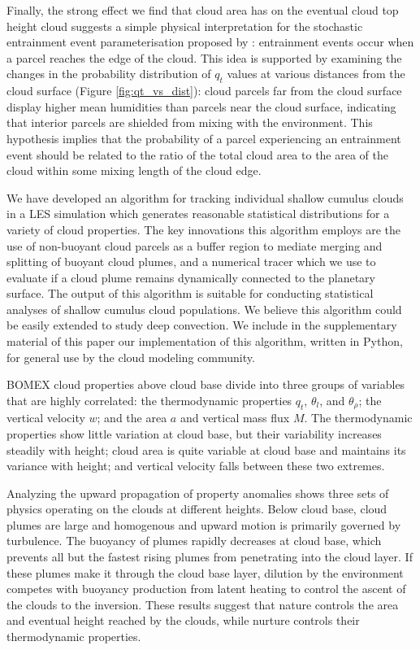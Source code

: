 \documentclass[acp]{copernicus}
\begin{document}
Finally, the strong effect we find that cloud area has on the eventual cloud 
top height cloud suggests a simple physical interpretation for the stochastic 
entrainment event parameterisation proposed by \cite{Romps2010a}: entrainment 
events occur when a parcel reaches the edge of the cloud. This idea is 
supported by examining the changes in the probability distribution of $q_t$ 
values at various distances from the cloud surface (Figure 
\ref{fig:qt_vs_dist}): cloud parcels far from the cloud surface display higher
mean humidities than parcels near the cloud surface, indicating that interior 
parcels are shielded from mixing with the environment.  This hypothesis 
implies that the probability of a parcel experiencing an entrainment event 
should be related to the ratio of the total cloud area to the area of the 
cloud within some mixing length of the cloud edge.


\conclusions
We have developed an algorithm for tracking individual shallow cumulus clouds 
in a LES simulation which generates reasonable statistical distributions for a 
variety of cloud properties.  The key innovations this algorithm employs are 
the use of non-buoyant cloud parcels as a buffer region to mediate merging and 
splitting of buoyant cloud plumes, and a numerical tracer which we use to 
evaluate if a cloud plume remains dynamically connected to the planetary 
surface.  The output of this algorithm is suitable for conducting statistical 
analyses of shallow cumulus cloud populations.  We believe this algorithm could 
be easily extended to study deep convection.  We include in the supplementary 
material of this paper our implementation of this algorithm, written in Python, 
for general use by the cloud modeling community.

BOMEX cloud properties above cloud base divide into three groups of variables 
that are highly correlated: the thermodynamic properties $q_t$, $\theta_l$, 
and $\theta_\rho$; the vertical velocity $w$; and the area $a$ and vertical 
mass flux $M$.  The thermodynamic properties show little variation at cloud 
base, but their variability increases steadily with height; cloud area is 
quite variable at cloud base and maintains its variance with height; and 
vertical velocity falls between these two extremes.

Analyzing the upward propagation of property anomalies shows three sets of 
physics operating on the clouds at different heights.  Below cloud base, cloud 
plumes are large and homogenous and upward motion is primarily governed by 
turbulence.  The buoyancy of plumes rapidly decreases at cloud base, which 
prevents all but the fastest rising plumes from penetrating into the cloud 
layer.  If these plumes make it through the cloud base layer, dilution by the 
environment competes with buoyancy production from latent heating to control 
the ascent of the clouds to the inversion.  These results suggest that 
nature controls the area and eventual height reached by the clouds, while 
nurture controls their thermodynamic properties.
\end{document}
